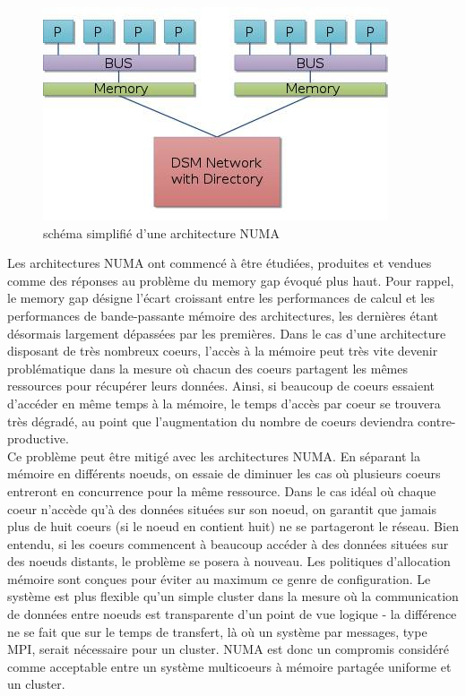 \documentclass{report}
\begin{document}
\begin{figure}
  \includegraphics[width=\linewidth]{NUMA.jpg}
  \caption{schéma simplifié d'une architecture NUMA}
  \label{fig:NUMA1}
\end{figure}

Les architectures NUMA ont commencé à être étudiées, produites et vendues comme des réponses au problème
du memory gap évoqué plus haut. Pour rappel, le memory gap désigne l'écart croissant entre les performances
de calcul et les performances de bande-passante mémoire des architectures, les dernières étant désormais 
largement dépassées par les premières. Dans le cas d'une architecture disposant de très nombreux coeurs,
l'accès à la mémoire peut très vite devenir problématique dans la mesure où chacun des coeurs partagent
les mêmes ressources pour récupérer leurs données. Ainsi, si beaucoup de coeurs essaient d'accéder en
même temps à la mémoire, le temps d'accès par coeur se trouvera très dégradé, au point que l'augmentation
du nombre de coeurs deviendra contre-productive. 
\\Ce problème peut être mitigé avec les architectures NUMA. En séparant la mémoire en différents noeuds,
on essaie de diminuer les cas où plusieurs coeurs entreront en concurrence pour la même ressource. Dans
le cas idéal où chaque coeur n'accède qu'à des données situées sur son noeud, on garantit que jamais
plus de huit coeurs (si le noeud en contient huit) ne se partageront le réseau. Bien entendu, si les
coeurs commencent à beaucoup accéder à des données situées sur des noeuds distants, le problème se posera
à nouveau. Les politiques d'allocation mémoire sont conçues pour éviter au maximum ce genre de configuration.
Le système est plus flexible qu'un simple cluster dans la mesure où la communication de données entre noeuds
est transparente d'un point de vue logique - la différence ne se fait que sur le temps de transfert, là
où un système par messages, type MPI,  serait nécessaire pour un cluster. NUMA est donc un compromis 
considéré comme acceptable entre un système multicoeurs à mémoire partagée uniforme et un cluster.
\end{document}
